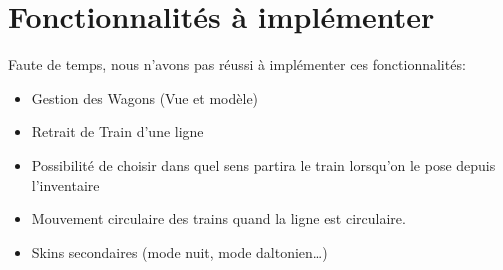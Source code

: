 \documentclass[report, backcover, french, nodocumentinfo]{upmethodology-document}
\begin{document}
	\section*{Fonctionnalités à implémenter}
		\p{}
		Faute de temps, nous n'avons pas réussi à implémenter ces fonctionnalités:
		\begin{itemize}
			\item Gestion des Wagons (Vue et modèle)
			\item Retrait de Train d'une ligne
			\item Possibilité de choisir dans quel sens partira le train lorsqu'on le pose depuis l'inventaire
			\item Mouvement circulaire des trains quand la ligne est circulaire.
			\item Skins secondaires (mode nuit, mode daltonien\ldots)
		\end{itemize}
\end{document}

